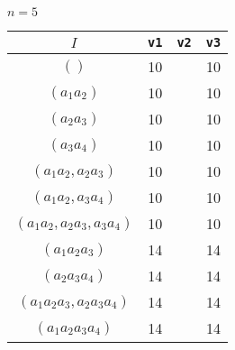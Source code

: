 \documentclass{article}
\begin{document}
\begin{flushleft}
\begin{center}
      $n=5$
      \begin{longtable}{|c|c|c|c|}
         \hline
         $I$ & \texttt{v1} & \texttt{v2} & \texttt{v3} \\
         \hline
         $()$ & 10 && 10 \\
         \hhline{|=|=|=|=|}
         $(a_1a_2)$ & 10 && 10\\
         $(a_2a_3)$ & 10 && 10 \\
         $(a_3a_4)$ & 10 && 10\\
         $(a_1a_2, a_2a_3)$ & 10 && 10 \\
         $(a_1a_2, a_3a_4)$ & 10 && 10 \\
         $(a_1a_2, a_2a_3, a_3a_4)$ & 10 && 10 \\
         \hhline{|=|=|=|=|}
         $(a_1a_2a_3)$ & 14 && 14\\
         $(a_2a_3a_4)$ & 14 && 14\\
         $(a_1a_2a_3, a_2a_3a_4)$ & 14 && 14\\
         \hhline{|=|=|=|=|}
         $(a_1a_2a_3a_4)$ & 14 && 14\\
         \hline
      \end{longtable}


\end{center}
\end{flushleft}
\end{document}
